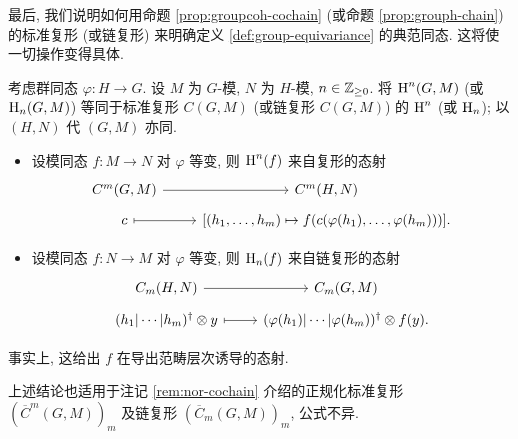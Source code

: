 最后, 我们说明如何用命题 \ref{prop:groupcoh-cochain} (或命题 \ref{prop:grouph-chain}) 的标准复形 (或链复形) 来明确定义 \ref{def:group-equivariance} 的典范同态. 这将使一切操作变得具体.

\begin{proposition}\label{prop:grp-equiv}
	考虑群同态 $\varphi: H \to G$. 设 $M$ 为 $G$-模, $N$ 为 $H$-模, $n \in \mathbb{Z}_{\geq 0}$. 将 $\operatorname{H}^n(G, M)$ (或 $\operatorname{H}_n(G, M)$) 等同于标准复形 $C(G, M)$ (或链复形 $C(G, M)$) 的 $\operatorname{H}^n$ (或 $\operatorname{H}_n$); 以 $(H, N)$ 代 $(G, M)$ 亦同.
	
	\begin{itemize}
		\item 设模同态 $f: M \to N$ 对 $\varphi$ 等变, 则 $\operatorname{H}^n(f)$ 来自复形的态射
		\[\begin{tikzcd}[row sep=tiny]
			C^m(G, M) \arrow[r] & C^m(H, N) \\
			c \arrow[mapsto, r] & {\left[ (h_1, \ldots, h_m) \mapsto f(c(\varphi(h_1), \ldots, \varphi(h_m))) \right]}.
		\end{tikzcd}\]
		\item 设模同态 $f: N \to M$ 对 $\varphi$ 等变, 则 $\operatorname{H}_n(f)$ 来自链复形的态射
		\[\begin{tikzcd}[row sep=tiny]
			C_m(H, N) \arrow[r] & C_m(G, M) \\
			(h_1 | \cdots | h_m)^\dagger \otimes y \arrow[mapsto, r] & (\varphi(h_1) | \cdots | \varphi(h_m))^\dagger \otimes f(y).
		\end{tikzcd}\]
	\end{itemize}
	事实上, 这给出 $f$ 在导出范畴层次诱导的态射.
	
	上述结论也适用于注记 \ref{rem:nor-cochain} 介绍的正规化标准复形 $(\overline{C}^m(G, M))_m$ 及链复形 $(\overline{C}_m(G, M))_m$, 公式不异.
\end{proposition}
